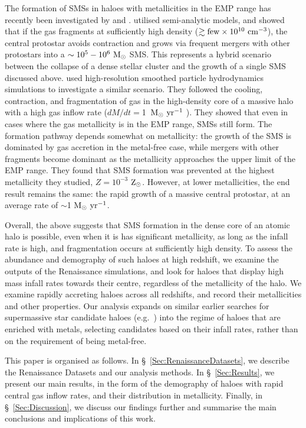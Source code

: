 \documentclass[graphics, twocolumn, usenatbib]{mn2e}
\newcommand{\msolaryr} {$\rm{M_{\odot}~yr^{-1}}~$}
\newcommand{\msolaryrc} {$\rm{M_{\odot}~yr^{-1}}$}
\newcommand{\zsolarc} {$\rm{Z_{\odot}}$}
\begin{document}
  The formation of SMSs in haloes with metallicities in the EMP range
  has recently been investigated by \cite{Tagawa_2020} and \cite{Chon_2020}. \cite{Tagawa_2020}  utilised semi-analytic models, and showed that if the gas fragments at sufficiently high density ($\gtrsim {\rm few}\times 10^{10}~{\rm cm^{-3}}$), the central protostar avoids contraction and  grows via frequent mergers with other protostars into a $\sim 10^5-10^6~{\rm M_\odot}$ SMS. This represents a hybrid scenario between the collapse of a dense stellar cluster and the growth of a single SMS discussed above.
   \cite{Chon_2020} used high-resolution smoothed particle
  hydrodynamics simulations to investigate a similar scenario. They followed the cooling, contraction, and fragmentation of gas in the high-density core of a massive halo with a high gas inflow rate ($dM/dt=$1~\msolaryr).  They showed that even in cases where the gas metallicity is in the EMP range, SMSs still form. The formation pathway depends somewhat on metallicity: the growth of the SMS is dominated by gas accretion in the metal-free case, while mergers with other fragments become dominant as the metallicity approaches the upper limit of the EMP range. They found that SMS formation was prevented at the highest metallicity they studied, $Z=10^{-3}$ \zsolarc. However, at lower metallicities, the end result remains the same: the rapid growth of a massive central protostar, at an average rate of $\sim$1 \msolaryrc.
  
Overall, the above suggests that SMS formation in the dense core of an atomic halo is possible, even when it is has significant metallicity, as long as the infall rate is high, and fragmentation occurs at sufficiently high density.  
To assess the abundance and demography of such haloes at high redshift, we examine the outputs of the Renaissance simulations,
and look for haloes that display high mass infall rates towards their centre, regardless of the metallicity of the halo.
We examine rapidly accreting haloes across all redshifts, and record their metallicities and other properties.
Our analysis expands on similar earlier searches for supermassive star candidate haloes (e.g.~\citealt{Habouzit_2016,Wise_2019}) into the regime of haloes that are enriched with metals, selecting candidates based on their infall rates, rather than on the requirement of being metal-free.

  
This paper is organised as follows.
In \S~\ref{Sec:RenaissanceDatasets}, we describe the Renaissance Datasets and our analysis methods.
In \S~\ref{Sec:Results}, we present  our main results, in the form of the demography of haloes with rapid central gas inflow rates, and their distribution in metallicity.  
Finally, in \S~\ref{Sec:Discussion}, 
we discuss our findings further and summarise the main conclusions and implications of this work.
\end{document}
